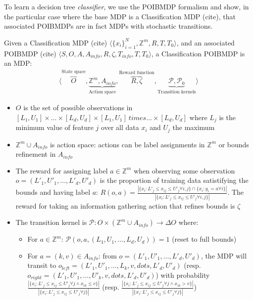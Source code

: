 To learn a decision tree \textit{classifier}, we use the POIBMDP formalism and show, in the particular case where the base MDP is a Classification MDP (cite), that associated POIBMDPs are in fact MDPs with stochastic transitions. 
\begin{definition}
    Given a Classification MDP (cite) $\langle {\{x_i\}}_{i=1}^N, \mathbb{Z}^m, R, T, T_0 \rangle$, and an associated POIBMDP (cite) $\langle S, O, A, A_{info}, R, \zeta, T_{info}, T, T_0\rangle$, a Classification POIBMDP is an MDP:
    \begin{align*}
        \langle \overbrace{O}^{\text{State space}}, \underbrace{\mathbb{Z}^m, A_{info}}_{\text{Action space}}, \overbrace{R, \zeta}^{\text{Reward function}}, \underbrace{\mathcal{P}, \mathcal{P}_0}_{\text{Transition kernels}} \rangle
    \end{align*}
    \begin{itemize}
        \item $O$ is the set of possible observations in $[L_1, U_1] \times \dots \times [L_d, U_d] \times [L_1, U_1] \ times \dots \times [L_d, U_d] $ where $L_j$ is the minimum value of feature $j$ over all data $x_i$ and $U_j$ the maximum
        \item $\mathbb{Z}^m \cup A_{info}$ is action space: actions can be label assignments in $\mathbb{Z}^m$ or bounds refinement in $A_{info}$
        \item The reward for assigning label $a\in \mathbb{Z}^m$ when observing some observation $o=(L'_1, U'_1, \dots, L'_d, U'_d)$ is the proportion of training data satistifying the bounds and having label $a$: $R(o, a) = \frac{|\{x_i: L'_j \leq x_{ij} \leq U'_j \forall i,j \} \cap \{x_i: y_i = a \forall i \}|}{|\{x_i: L'_j \leq x_{ij} \leq U'_j \forall i,j \}|}$. 
        The reward for taking an information gathering action that refines bounds is $\zeta$
        \item The transition kernel is $\mathcal{P}:O \times (\mathbb{Z}^m \cup A_{info}) \rightarrow \Delta O$ where:
        \begin{itemize}
            \item For $a \in \mathbb{Z}^m$: $\mathcal{P}(o, a, (L_1, U_1, \dots, L_d, U_d)) = 1$ (reset to full bounds)
            \item For $a = (k, v) \in A_{info}$: from $o=(L'_1, U'_1, \dots, L'_d, U'_d)$, the MDP will transit to $o_{left} = (L'_1, U'_1, \dots, L_k, v, dots, L'_d, U'_d)$ (resp. $o_{right} = (L'_1, U'_1, \dots, U'_k, v, dots, L'_d, U'_d)$) with probability $\frac{|\{x_i: L'_j \leq x_{ij} \leq U'_j \forall j \land x_{ik} \leq v\}|}{|\{x_i: L'_j \leq x_{ij} \leq U'_j \forall j\}|}$ (resp. $\frac{|\{x_i: L'_j \leq x_{ij} \leq U'_j \forall j \land x_{ik} > v\}|}{|\{x_i: L'_j \leq x_{ij} \leq U'_j \forall j\}|}$)
        \end{itemize}
    \end{itemize}
\end{definition}

